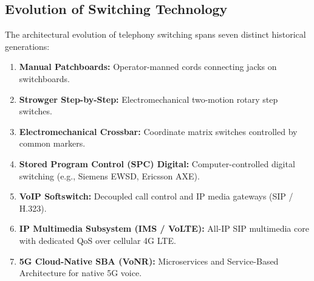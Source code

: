 \documentclass[12pt,a4paper]{report}
\begin{document}
\subsection{Evolution of Switching Technology}
The architectural evolution of telephony switching spans seven distinct historical generations:
\begin{enumerate}
    \item \textbf{Manual Patchboards:} Operator-manned cords connecting jacks on switchboards.
    \item \textbf{Strowger Step-by-Step:} Electromechanical two-motion rotary step switches.
    \item \textbf{Electromechanical Crossbar:} Coordinate matrix switches controlled by common markers.
    \item \textbf{Stored Program Control (SPC) Digital:} Computer-controlled digital switching (e.g., Siemens EWSD, Ericsson AXE).
    \item \textbf{VoIP Softswitch:} Decoupled call control and IP media gateways (SIP / H.323).
    \item \textbf{IP Multimedia Subsystem (IMS / VoLTE):} All-IP SIP multimedia core with dedicated QoS over cellular 4G LTE.
    \item \textbf{5G Cloud-Native SBA (VoNR):} Microservices and Service-Based Architecture for native 5G voice.
\end{enumerate}
\end{document}
